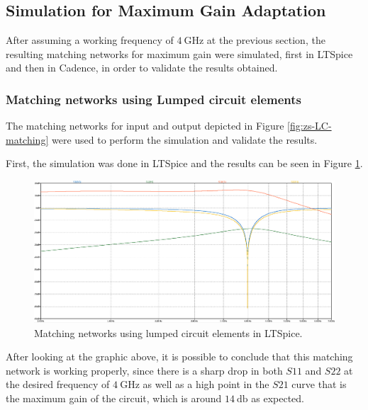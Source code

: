 \subsection{Simulation for Maximum Gain Adaptation}

After assuming a working frequency of $\SI{4}{\giga\hertz}$ at the previous section, the resulting matching networks for maximum gain were simulated, first in LTSpice and then in Cadence, in order to validate the results obtained.

\subsubsection{Matching networks using Lumped circuit elements}

The matching networks for input and output depicted in Figure \ref{fig:zs-LC-matching} were used to perform the simulation and validate the results.

First, the simulation was done in LTSpice and the results can be seen in Figure \ref{fig:SIMLCMatchingCircuit}.
\begin{figure}[H]
    \centering
    \includegraphics[width=1\textwidth]{Images/LT-LC-gain.png}
    \caption{Matching networks using lumped circuit elements in LTSpice.}
    \label{fig:SIMLCMatchingCircuit}
\end{figure}

After looking at the graphic above, it is possible to conclude that this matching network is working properly, since there is a sharp drop in both $S11$ and $S22$ at the desired frequency of $\SI{4}{\giga\hertz}$ as well as a high point in the $S21$ curve that is the maximum gain of the circuit, which is around $\SI{14}{\decibel}$ as expected.

